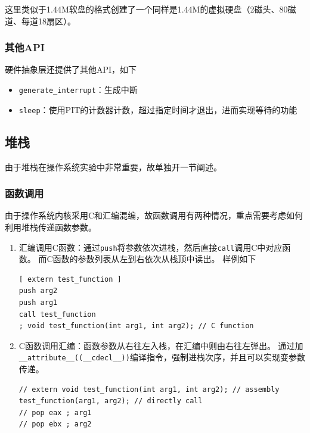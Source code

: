 \documentclass[logo,reportComp]{thesis}
\begin{document}
这里类似于1.44M软盘的格式创建了一个同样是1.44M的虚拟硬盘（2磁头、80磁道、每道18扇区）。

\subsubsection{其他API}
硬件抽象层还提供了其他API，如下
\begin{itemize}
	\item \verb'generate_interrupt'：生成中断
	\item \verb'sleep'：使用PIT的计数器计数，超过指定时间才退出，进而实现等待的功能
\end{itemize}

\subsection{堆栈}
由于堆栈在操作系统实验中非常重要，故单独开一节阐述。

\subsubsection{函数调用}
由于操作系统内核采用C和汇编混编，故函数调用有两种情况，重点需要考虑如何利用堆栈传递函数参数。

\begin{enumerate}
\item 汇编调用C函数：通过\verb'push'将参数依次进栈，然后直接\verb'call'调用C中对应函数。
而C函数的参数列表从左到右依次从栈顶中读出。
样例如下
\begin{lstlisting}[language={[x86masm]Assembler}]
[ extern test_function ]
push arg2
push arg1
call test_function
; void test_function(int arg1, int arg2); // C function
\end{lstlisting}

\item C函数调用汇编：函数参数从右往左入栈，在汇编中则由右往左弹出。
通过加\\\verb'__attribute__((__cdecl__))'编译指令，强制进栈次序，并且可以实现变参数传递。
\begin{lstlisting}
// extern void test_function(int arg1, int arg2); // assembly
test_function(arg1, arg2); // directly call
// pop eax ; arg1
// pop ebx ; arg2
\end{lstlisting}
\end{enumerate}
\end{document}
